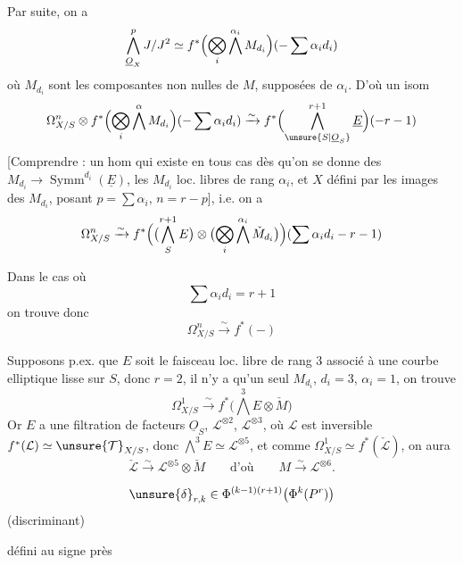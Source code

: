 

Par suite, on a
\[
\bigwedge_{\underline O_X}^p J/J^2\simeq
f^*\Bigl(\bigotimes_i\bigwedge^{\alpha_i}M_{d_i}\Bigr)(-\sum\alpha_i d_i)
\]
où $M_{d_i}$ sont les composantes non nulles de $M$, supposées
de  $\alpha_i$. D'où un isom
\[
\Omega^n_{X/S}\otimes f^*\Bigl(\bigotimes_i\bigwedge^{\alpha}M_{d_i}\Bigr)(-\sum\alpha_i d_i)
\xrightarrow{\sim}f^*\Bigl(\bigwedge_{\unsure{S|\underline O_S}}^{r+1}\underline E\Bigr)(-r-1)
\]
[Comprendre : un hom qui existe en tous cas dès
qu'on se donne des $M_{d_i}\to\operatorname{Symm}^{d_i}(\underline E)$, les $M_{d_i}$ loc.
libres de rang $\alpha_i$, et $X$ défini par
 les images
des $M_{d_i}$, posant $p=\sum\alpha_i$, $n=r-p$], i.e. on a
\[
\Omega^n_{X/S}\xrightarrow{\sim}
f^*\Bigl(\bigl(\bigwedge_S^{r+1}E\bigr)\otimes
\bigl(\bigotimes_i\bigwedge^{\alpha_i}\check M_{d_i}\bigr)\Bigr)
(\sum\alpha_i d_i-r-1)
\]

Dans le cas où
\[
\sum\alpha_i d_i=r+1
\]
on trouve donc
\[
\Omega^n_{X/S}\xrightarrow{\sim}f^*(-)
\]

Supposons p.ex. que $E$ soit le faisceau loc. libre de
rang $3$ associé à une courbe elliptique lisse
sur $S$, donc $r=2$, il n'y a qu'un seul $M_{d_i}$, $d_i=3$,
$\alpha_i=1$, on trouve
\[
\Omega^1_{X/S}\xrightarrow{\sim}f^*\bigl(\bigwedge^3E\otimes\check M\bigr)
\]
Or $E$ a une filtration de facteurs $\underline O_S$,
 $\mathcal L^{\otimes2}$, $\mathcal L^{\otimes3}$,
où $\mathcal L$ est inversible 
$f^*(\mathcal L)\simeq\unsure{\mathcal T}_{X/S}$, donc
$\bigwedge^3E\simeq\mathcal L^{\otimes5}$, et comme
$\Omega^1_{X/S}\simeq f^*(\check{\mathcal L})$, on aura
\[
\check{\mathcal L}\xrightarrow{\sim}\mathcal L^{\otimes5}\otimes\check M
\qquad\text{d'où}\qquad M\xrightarrow{\sim}\mathcal L^{\otimes6}.
\]



\[
\unsure{\delta}_{r,k}\in\Phi^{(k-1)(r+1)}\bigl(\Phi^k(P^r)\bigr)
\]
(discriminant)

défini au signe près


